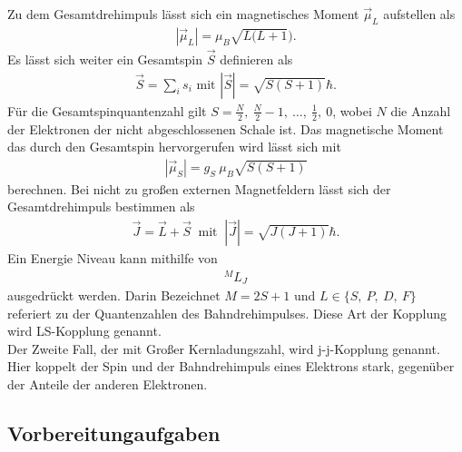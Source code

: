 Zu dem Gesamtdrehimpuls lässt sich ein magnetisches Moment $\vec{\mu}_L$ aufstellen als
\begin{align}
	|\vec{\mu}_L|=\mu_B\sqrt{L(L+1}).
\end{align}
Es lässt sich weiter ein Gesamtspin $\vec{S}$ definieren als
\begin{align}
	\vec{S}=\sum_is_i \text{ mit } |\vec{S}|=\sqrt{S(S+1)}\hbar.
\end{align}
Für die Gesamtspinquantenzahl gilt $S=\frac{N}{2},\ \frac{N}{2}-1 ,\ \dots,\ \frac{1}{2},\ 0$, wobei $N$ die Anzahl der Elektronen der nicht abgeschlossenen Schale ist.
Das magnetische Moment das durch den Gesamtspin hervorgerufen wird lässt sich mit
\begin{align}
	|\vec{\mu}_S|=g_S\ \mu_B\sqrt{S(S+1)}
\end{align}
berechnen.
Bei nicht zu großen externen Magnetfeldern lässt sich der Gesamtdrehimpuls bestimmen als
\begin{align}
	\vec{J}=\vec{L}+\vec{S} \ \text{ mit }\ |\vec{J}|=\sqrt{J(J+1)}\hbar.
\end{align}
Ein Energie Niveau kann mithilfe von 
\begin{align}
	{}^ML_J
\end{align}
ausgedrückt werden.
Darin Bezeichnet $M=2S+1$ und $L\in\{S,\ P,\ D,\ F\}$ referiert zu der Quantenzahlen des Bahndrehimpulses.
Diese Art der Kopplung wird LS-Kopplung genannt.\\
Der Zweite Fall, der mit Großer Kernladungszahl, wird j-j-Kopplung genannt.
Hier koppelt der Spin und der Bahndrehimpuls eines Elektrons stark, gegenüber der Anteile der anderen Elektronen.


\subsection{Vorbereitungaufgaben}
\newpage

